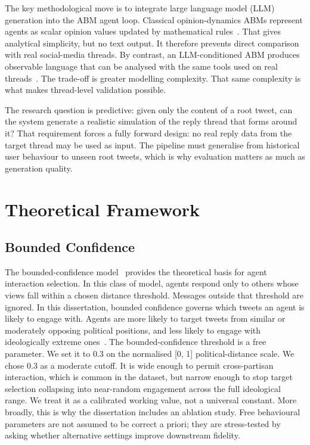 \documentclass[logo,bsc,singlespacing,parskip,online]{infthesis}
\begin{document}
The key methodological move is to integrate large language model (LLM) generation into the ABM agent loop. Classical opinion-dynamics ABMs represent agents as scalar opinion values updated by mathematical rules~\citep{deffuant2000mixing,hegselmann2002opinion}. That gives analytical simplicity, but no text output. It therefore prevents direct comparison with real social-media threads. By contrast, an LLM-conditioned ABM produces observable language that can be analysed with the same tools used on real threads~\citep{butler2024misinformation,composta2025simulating}. The trade-off is greater modelling complexity. That same complexity is what makes thread-level validation possible.

The research question is predictive: given only the content of a root tweet, can the system generate a realistic simulation of the reply thread that forms around it? That requirement forces a fully forward design: no real reply data from the target thread may be used as input. The pipeline must generalise from historical user behaviour to unseen root tweets, which is why evaluation matters as much as generation quality.

\section{Theoretical Framework}

\subsection{Bounded Confidence}

The bounded-confidence model~\citep{deffuant2000mixing} provides the theoretical basis for agent interaction selection. In this class of model, agents respond only to others whose views fall within a chosen distance threshold. Messages outside that threshold are ignored. In this dissertation, bounded confidence governs which tweets an agent is likely to engage with. Agents are more likely to target tweets from similar or moderately opposing political positions, and less likely to engage with ideologically extreme ones~\citep{diehl2016political,composta2025simulating}. The bounded-confidence threshold is a free parameter. We set it to 0.3 on the normalised [0, 1] political-distance scale. We chose 0.3 as a moderate cutoff. It is wide enough to permit cross-partisan interaction, which is common in the dataset, but narrow enough to stop target selection collapsing into near-random engagement across the full ideological range. We treat it as a calibrated working value, not a universal constant. More broadly, this is why the dissertation includes an ablation study. Free behavioural parameters are not assumed to be correct a priori; they are stress-tested by asking whether alternative settings improve downstream fidelity.
\end{document}

